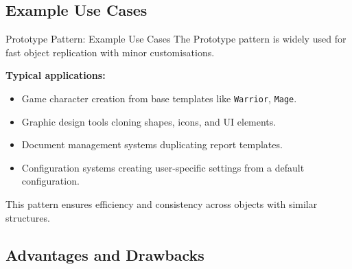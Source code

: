 \documentclass[aspectratio=169, table]{beamer}
\begin{document}
\subsection{Example Use Cases}

\begin{frame}[fragile]{Prototype Pattern: Example Use Cases}
	\vspace{20pt}
	The Prototype pattern is widely used for fast object replication with minor customisations.
	
	\vspace{10pt}
	\textbf{Typical applications:}
	\begin{itemize}
		\item Game character creation from base templates like \texttt{Warrior}, \texttt{Mage}.
		\item Graphic design tools cloning shapes, icons, and UI elements.
		\item Document management systems duplicating report templates.
		\item Configuration systems creating user-specific settings from a default configuration.
	\end{itemize}
	
	\vspace{5pt}
	This pattern ensures efficiency and consistency across objects with similar structures.
\end{frame}

\subsection{Advantages and Drawbacks}
\end{document}
